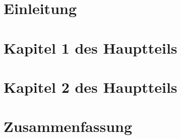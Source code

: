 \documentclass[
		fontsize=10pt,		%
		a4paper,			%
		parskip=half-,		%
		twoside,			%
		headings=big,	%
		appendixprefix=true,
		]{scrreprt}		%
\begin{document}
\clearpage


\clearpage
\pagestyle{fancy}


\chapter{Einleitung}\label{chapter:einleitung}



\chapter{Kapitel 1 des Hauptteils}\label{chapter:xxxname1xxx}


\chapter{Kapitel 2 des Hauptteils}\label{chapter:xxxname2xxx}





\clearpage


\chapter{Zusammenfassung}

\end{document}
